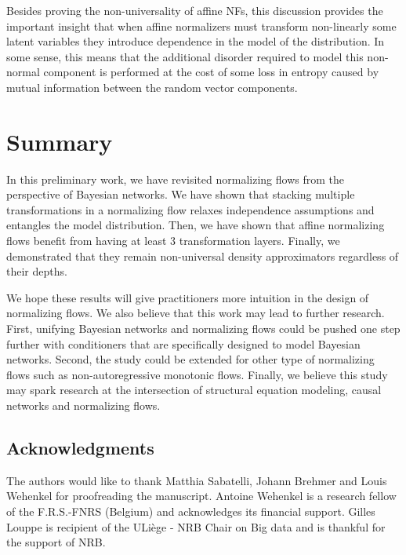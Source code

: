 \documentclass{article}
\begin{document}
Besides proving the non-universality of affine NFs, this discussion provides the important insight that when affine normalizers must transform non-linearly some latent variables they introduce dependence in the model of the distribution. In some sense, this means that the additional disorder required to model this non-normal component is performed at the cost of some loss in entropy caused by mutual information between the random vector components. 
\section{Summary}

In this preliminary work, we have revisited normalizing flows from the perspective of Bayesian networks.
We have shown that stacking multiple transformations in a normalizing flow relaxes independence assumptions and entangles the model distribution.
Then, we have shown that affine normalizing flows benefit from having at least 3 transformation layers. 
Finally, we demonstrated that they remain non-universal density approximators regardless of their depths.


We hope these results will give practitioners more intuition in the design of normalizing flows.
We also believe that this work may lead to further research. 
First, unifying Bayesian networks and normalizing flows could be pushed one step further with conditioners that are specifically designed to model Bayesian networks. 
Second, the study could be extended for other type of normalizing flows such as non-autoregressive monotonic flows. 
Finally, we believe this study may spark research at the intersection of structural equation modeling, causal networks and normalizing flows.
\newpage
\subsection*{Acknowledgments}
The authors would like to thank Matthia Sabatelli, Johann Brehmer  and Louis Wehenkel for proofreading the manuscript. 
Antoine Wehenkel is a research fellow of the F.R.S.-FNRS (Belgium) and acknowledges its financial support.
Gilles Louppe is recipient of the ULi{\`e}ge - NRB Chair on Big data and is thankful for the support of NRB.


\end{document}
